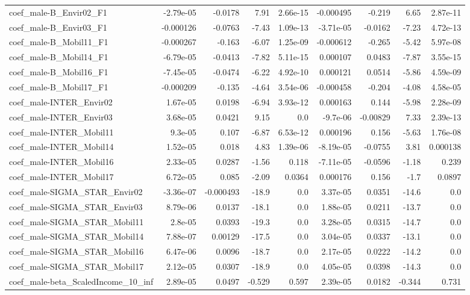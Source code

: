 \begin{tabular}{lrrrrrrrr}
coef_male-B_Envir02_F1 & -2.79e-05 & -0.0178 & 7.91 & 2.66e-15 & -0.000495 & -0.219 & 6.65 & 2.87e-11 \\
coef_male-B_Envir03_F1 & -0.000126 & -0.0763 & -7.43 & 1.09e-13 & -3.71e-05 & -0.0162 & -7.23 & 4.72e-13 \\
coef_male-B_Mobil11_F1 & -0.000267 & -0.163 & -6.07 & 1.25e-09 & -0.000612 & -0.265 & -5.42 & 5.97e-08 \\
coef_male-B_Mobil14_F1 & -6.79e-05 & -0.0413 & -7.82 & 5.11e-15 & 0.000107 & 0.0483 & -7.87 & 3.55e-15 \\
coef_male-B_Mobil16_F1 & -7.45e-05 & -0.0474 & -6.22 & 4.92e-10 & 0.000121 & 0.0514 & -5.86 & 4.59e-09 \\
coef_male-B_Mobil17_F1 & -0.000209 & -0.135 & -4.64 & 3.54e-06 & -0.000458 & -0.204 & -4.08 & 4.58e-05 \\
coef_male-INTER_Envir02 & 1.67e-05 & 0.0198 & -6.94 & 3.93e-12 & 0.000163 & 0.144 & -5.98 & 2.28e-09 \\
coef_male-INTER_Envir03 & 3.68e-05 & 0.0421 & 9.15 & 0.0 & -9.7e-06 & -0.00829 & 7.33 & 2.39e-13 \\
coef_male-INTER_Mobil11 & 9.3e-05 & 0.107 & -6.87 & 6.53e-12 & 0.000196 & 0.156 & -5.63 & 1.76e-08 \\
coef_male-INTER_Mobil14 & 1.52e-05 & 0.018 & 4.83 & 1.39e-06 & -8.19e-05 & -0.0755 & 3.81 & 0.000138 \\
coef_male-INTER_Mobil16 & 2.33e-05 & 0.0287 & -1.56 & 0.118 & -7.11e-05 & -0.0596 & -1.18 & 0.239 \\
coef_male-INTER_Mobil17 & 6.72e-05 & 0.085 & -2.09 & 0.0364 & 0.000176 & 0.156 & -1.7 & 0.0897 \\
coef_male-SIGMA_STAR_Envir02 & -3.36e-07 & -0.000493 & -18.9 & 0.0 & 3.37e-05 & 0.0351 & -14.6 & 0.0 \\
coef_male-SIGMA_STAR_Envir03 & 8.79e-06 & 0.0137 & -18.1 & 0.0 & 1.88e-05 & 0.0211 & -13.7 & 0.0 \\
coef_male-SIGMA_STAR_Mobil11 & 2.8e-05 & 0.0393 & -19.3 & 0.0 & 3.28e-05 & 0.0315 & -14.7 & 0.0 \\
coef_male-SIGMA_STAR_Mobil14 & 7.88e-07 & 0.00129 & -17.5 & 0.0 & 3.04e-05 & 0.0337 & -13.1 & 0.0 \\
coef_male-SIGMA_STAR_Mobil16 & 6.47e-06 & 0.0096 & -18.7 & 0.0 & 2.17e-05 & 0.0222 & -14.2 & 0.0 \\
coef_male-SIGMA_STAR_Mobil17 & 2.12e-05 & 0.0307 & -18.9 & 0.0 & 4.05e-05 & 0.0398 & -14.3 & 0.0 \\
coef_male-beta_ScaledIncome_10_inf & 2.89e-05 & 0.0497 & -0.529 & 0.597 & 2.39e-05 & 0.0182 & -0.344 & 0.731 \\

\end{tabular}
